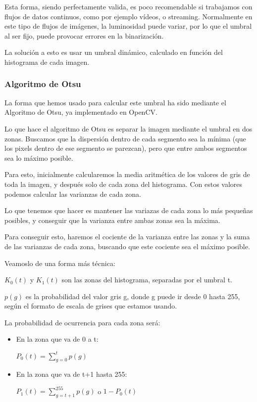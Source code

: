 Esta forma, siendo perfectamente valida, es poco recomendable si trabajamos con flujos de datos continuos, como por ejemplo vídeos, o streaming\cite{streaming}.
Normalmente en este tipo de flujos de imágenes, la luminosidad puede variar, por lo que el umbral al ser fijo, puede provocar errores en la binarización.

La solución a esto es usar un umbral dinámico, calculado en función del histograma de cada imagen.


\subsubsection{Algoritmo de Otsu}
La forma que hemos usado para calcular este umbral ha sido mediante el Algoritmo de Otsu\cite{wikiotsu}, ya implementado en OpenCV.

Lo que hace el algoritmo de Otsu es separar la imagen mediante el umbral en dos zonas. Buscamos que la dispersión dentro de cada segmento sea la mínima (que los pixels dentro de ese segmento se parezcan), pero que entre ambos segmentos sea lo máximo posible.

Para esto, inicialmente calcularemos la media aritmética de los valores de gris de toda la imagen, y después solo de cada zona del histograma. Con estos valores podemos calcular las varianzas de cada zona. 

Lo que tenemos que hacer es mantener las variazas de cada zona lo más pequeñas posibles, y conseguir que la varianza entre ambas zonas sea la máxima.

Para conseguir esto, haremos el cociente de la varianza entre las zonas y la suma de las varianzas de cada zona, buscando que este cociente sea el máximo posible. 

Veamoslo de una forma más técnica:

$K_0(t)$ y $K_1(t)$ son las zonas del histograma, separadas por el umbral t.

$p(g)$ es la probabilidad del valor gris g, donde g puede ir desde 0 hasta 255, según el formato de escala de grises que estamos usando.

La probabilidad de ocurrencia para cada zona será:
\begin{itemize}

\item En la zona que va de 0 a t:

$P_0(t)= \sum_{g=0}^{t}p(g)$ 

\item En la zona que va de t+1 hasta 255:

$P_1(t)= \sum_{g=t+1}^{255}p(g)$ o $1-P_0(t)$

\end{itemize}

